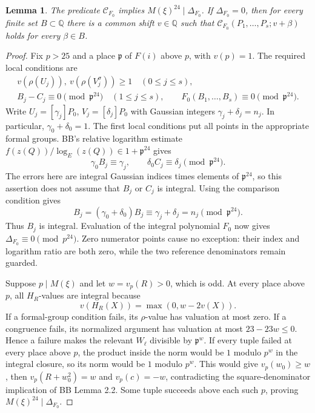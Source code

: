 \documentclass[11pt,a4paper]{article}
\newtheorem{lemma}[theorem]{Lemma}
\newcommand{\Q}{\mathbb Q}\newcommand{\Z}{\mathbb Z}
\begin{document}
\begin{lemma}\label{lem:quadraticlocal}
The predicate $\mathcal C_{F_0}$ implies
$M(\xi)^{24}\mid\Delta_{F_0}$. If $\Delta_{F_0}=0$, then for
every finite set $B\subset\Q$ there is a common shift $v\in\Q$
such that $\mathcal C_{F_0}(P_1,\ldots,P_s;v+\beta)$ holds for
every $\beta\in B$.
\end{lemma}
\begin{proof}
Fix $p>25$ and a place $\mathfrak p$ of $F(i)$ above $p$, with
$v(p)=1$. The required local conditions are
\begin{gather*}
 v(\rho(U_j)),\ v(\rho(V_j^\sigma))\ge1
       \quad(0\le j\le s),\\
 B_j-C_j\equiv0\pmod{\mathfrak p^{24}}
       \quad(1\le j\le s),\qquad
 F_0(B_1,\ldots,B_s)\equiv0\pmod{\mathfrak p^{24}}.
\end{gather*}
Write $U_j=[\gamma_j]P_0$, $V_j=[\delta_j]P_0$ with Gaussian
integers $\gamma_j+\delta_j=n_j$. In particular,
$\gamma_0+\delta_0=1$. The first local conditions put all points
in the appropriate formal groups. BB's relative logarithm estimate
$f(z(Q))/\log_E(z(Q))\in1+\mathfrak p^{24}$ gives
\[
 \gamma_0B_j\equiv\gamma_j,\qquad
 \delta_0C_j\equiv\delta_j\pmod{\mathfrak p^{24}}.
\]
The errors here are integral Gaussian indices times elements of
$\mathfrak p^{24}$, so this assertion does not assume that $B_j$
or $C_j$ is integral. Using the comparison condition gives
\[
 B_j=(\gamma_0+\delta_0)B_j
      \equiv\gamma_j+\delta_j=n_j\pmod{\mathfrak p^{24}}.
\]
Thus $B_j$ is integral. Evaluation of the integral polynomial $F_0$
now gives $\Delta_{F_0}\equiv0\pmod{p^{24}}$. Zero numerator
points cause no exception: their index and logarithm ratio are both
zero, while the two reference denominators remain guarded.

Suppose $p\mid M(\xi)$ and let $w=v_p(R)>0$, which is odd.
At every place above $p$, all $H_R$-values are integral because
\[
 v(H_R(X))=\max(0,w-2v(X)).
\]
If a formal-group condition fails, its $\rho$-value has valuation
at most zero. If a congruence fails, its normalized argument has
valuation at most $23-23w\le0$. Hence a failure makes the relevant
$W_\ell$ divisible by $\mathfrak p^w$. If every tuple failed at
every place above $p$, the product inside the norm would be $1$
modulo $p^w$ in the integral closure, so its norm would be $1$
modulo $p^w$. This would give $v_p(w_0)\ge w$, then
$v_p(R+w_0^2)=w$ and $v_p(c)=-w$, contradicting the square-denominator
implication of BB Lemma 2.2. Some tuple succeeds above each such
$p$, proving $M(\xi)^{24}\mid\Delta_{F_0}$.


\end{proof}
\end{document}
